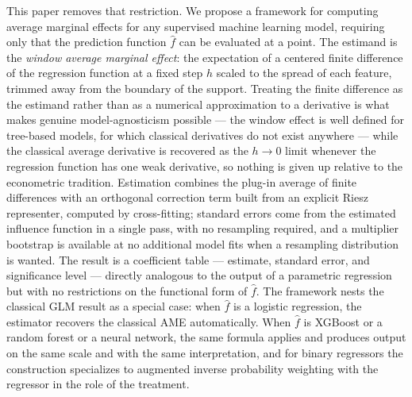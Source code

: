 \documentclass[12pt]{article}
\begin{document}
	This paper removes that restriction. We propose a framework for computing average
	marginal effects for any supervised machine learning model, requiring only that the
	prediction function $\hat{f}$ can be evaluated at a point. The estimand is the
	\emph{window average marginal effect}: the expectation of a centered finite
	difference of the regression function at a fixed step $h$ scaled to the spread of
	each feature, trimmed away from the boundary of the support. Treating the finite
	difference as the estimand rather than as a numerical approximation to a
	derivative is what makes genuine model-agnosticism possible --- the window effect
	is well defined for tree-based models, for which classical derivatives do not
	exist anywhere --- while the classical average derivative is recovered as the
	$h \to 0$ limit whenever the regression function has one weak derivative, so
	nothing is given up relative to the econometric tradition. Estimation combines
	the plug-in average of finite differences with an orthogonal correction term
	built from an explicit Riesz representer, computed by cross-fitting; standard
	errors come from the estimated influence function in a single pass, with no
	resampling required, and a multiplier bootstrap is available at no additional
	model fits when a resampling distribution is wanted. The result is a coefficient
	table --- estimate, standard error, and significance level --- directly analogous
	to the output of a parametric regression but with no restrictions on the
	functional form of $\hat{f}$. The framework nests the classical GLM result as a
	special case: when $\hat{f}$ is a logistic regression, the estimator recovers the
	classical AME automatically. When $\hat{f}$ is XGBoost or a random forest or a
	neural network, the same formula applies and produces output on the same scale
	and with the same interpretation, and for binary regressors the construction
	specializes to augmented inverse probability weighting with the regressor in the
	role of the treatment.
	
\end{document}
